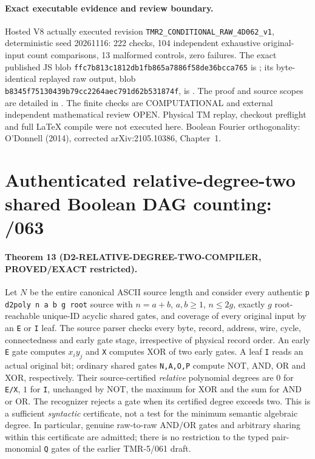 \documentclass[11pt]{article}
\begin{document}
\paragraph{Exact executable evidence and review boundary.}
Hosted V8 actually executed revision \texttt{TMR2\_CONDITIONAL\_RAW\_4D062\_v1}, deterministic seed 20261116: 222 checks, 104 independent exhaustive original-input count comparisons, 13 malformed controls, zero failures.
The exact published JS blob \texttt{ffc7b813c1812db1fb865a7886f58de36bcca765} is ; its byte-identical replayed raw output, blob \texttt{b8345f75130439b79cc2264aec791d62b531874f}, is .
The proof and source scopes are detailed in .
The finite checks are COMPUTATIONAL and external independent mathematical review OPEN.
Physical TM replay, checkout preflight and full LaTeX compile were not executed here.
Boolean Fourier orthogonality: O'Donnell (2014), corrected arXiv:2105.10386, Chapter~1.


\section{Authenticated relative-degree-two shared Boolean DAG counting: /063}
\paragraph{Theorem 13 (D2-RELATIVE-DEGREE-TWO-COMPILER, PROVED/EXACT restricted).}
Let $N$ be the entire canonical ASCII source length and consider every authentic
\texttt{p d2poly n a b g root} source with $n=a+b$, $a,b\ge1$,
$n\le2g$, exactly $g$ root-reachable unique-ID acyclic shared gates,
and coverage of every original input by an \texttt{E} or \texttt{I} leaf.
The source parser checks every byte, record, address, wire, cycle,
connectedness and early gate stage, irrespective of physical record order.
An early \texttt{E} gate computes $x_i y_j$ and \texttt{X} computes
XOR of two early gates.  A leaf \texttt{I} reads an actual original bit;
ordinary shared gates \texttt{N,A,O,P} compute NOT, AND, OR and XOR,
respectively.  Their source-certified \emph{relative} polynomial degrees
are $0$ for \texttt{E/X}, $1$ for \texttt{I}, unchanged by NOT,
the maximum for XOR and the sum for AND or OR.  The recognizer rejects
a gate when its certified degree exceeds two.
This is a sufficient \emph{syntactic} certificate, not a test for the
minimum semantic algebraic degree.  In particular, genuine raw-to-raw
AND/OR gates and arbitrary sharing within this certificate are admitted;
there is no restriction to the typed pair-monomial \texttt{Q} gates of
the earlier TMR-5/061 draft.
\end{document}
